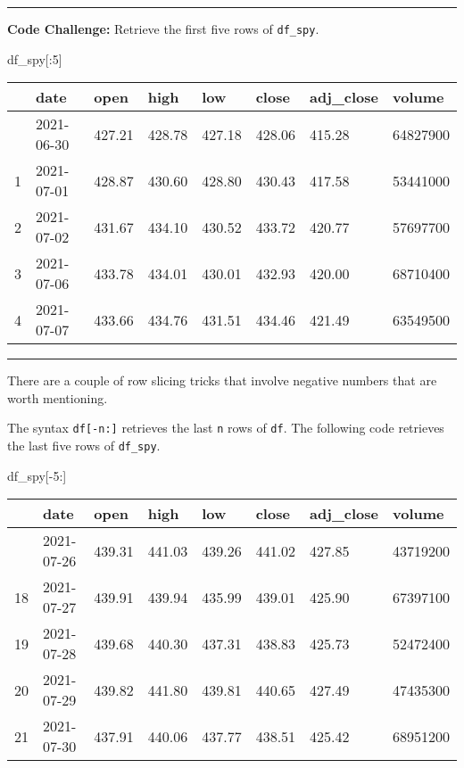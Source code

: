 \documentclass[
  letterpaper,
  DIV=11,
  numbers=noendperiod]{scrreprt}
\newenvironment{Shaded}{\begin{snugshade}}{\end{snugshade}}
\newcommand{\DecValTok}[1]{\textcolor[rgb]{0.68,0.00,0.00}{#1}}
\newcommand{\NormalTok}[1]{\textcolor[rgb]{0.00,0.23,0.31}{#1}}
\newcommand{\OperatorTok}[1]{\textcolor[rgb]{0.37,0.37,0.37}{#1}}
\begin{document}
\begin{center}\rule{0.5\linewidth}{0.5pt}\end{center}

\textbf{Code Challenge:} Retrieve the first five rows of
\texttt{df\_spy}.

\begin{Shaded}
\begin{Highlighting}[]
\NormalTok{df\_spy[:}\DecValTok{5}\NormalTok{]}
\end{Highlighting}
\end{Shaded}

\begin{longtable}[]{@{}llllllll@{}}
\toprule\noalign{}
& date & open & high & low & close & adj\_close & volume \\
\midrule\noalign{}
\endhead
\bottomrule\noalign{}
\endlastfoot
0 & 2021-06-30 & 427.21 & 428.78 & 427.18 & 428.06 & 415.28 &
64827900 \\
1 & 2021-07-01 & 428.87 & 430.60 & 428.80 & 430.43 & 417.58 &
53441000 \\
2 & 2021-07-02 & 431.67 & 434.10 & 430.52 & 433.72 & 420.77 &
57697700 \\
3 & 2021-07-06 & 433.78 & 434.01 & 430.01 & 432.93 & 420.00 &
68710400 \\
4 & 2021-07-07 & 433.66 & 434.76 & 431.51 & 434.46 & 421.49 &
63549500 \\
\end{longtable}

\begin{center}\rule{0.5\linewidth}{0.5pt}\end{center}

There are a couple of row slicing tricks that involve negative numbers
that are worth mentioning.

The syntax \texttt{df{[}-n:{]}} retrieves the last \texttt{n} rows of
\texttt{df}. The following code retrieves the last five rows of
\texttt{df\_spy}.

\begin{Shaded}
\begin{Highlighting}[]
\NormalTok{df\_spy[}\OperatorTok{{-}}\DecValTok{5}\NormalTok{:]}
\end{Highlighting}
\end{Shaded}

\begin{longtable}[]{@{}llllllll@{}}
\toprule\noalign{}
& date & open & high & low & close & adj\_close & volume \\
\midrule\noalign{}
\endhead
\bottomrule\noalign{}
\endlastfoot
17 & 2021-07-26 & 439.31 & 441.03 & 439.26 & 441.02 & 427.85 &
43719200 \\
18 & 2021-07-27 & 439.91 & 439.94 & 435.99 & 439.01 & 425.90 &
67397100 \\
19 & 2021-07-28 & 439.68 & 440.30 & 437.31 & 438.83 & 425.73 &
52472400 \\
20 & 2021-07-29 & 439.82 & 441.80 & 439.81 & 440.65 & 427.49 &
47435300 \\
21 & 2021-07-30 & 437.91 & 440.06 & 437.77 & 438.51 & 425.42 &
68951200 \\
\end{longtable}
\end{document}
